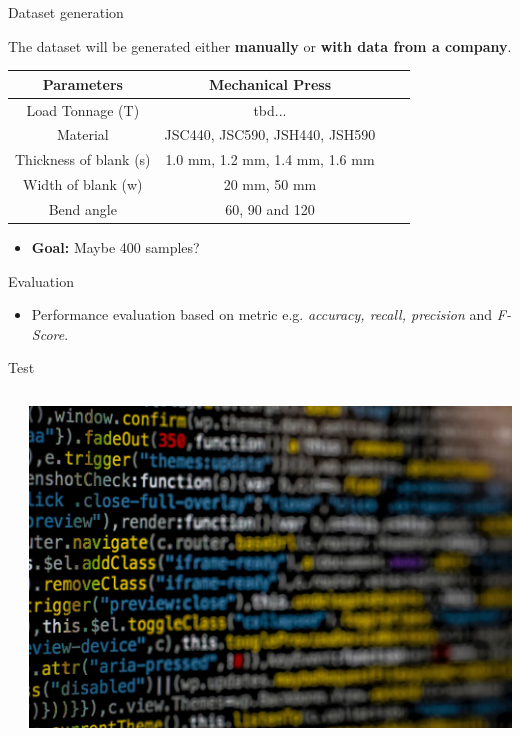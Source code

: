 \documentclass{beamer}
\begin{document}
\begin{frame}{Dataset generation}

The dataset will be generated either \textbf{manually} or \textbf{with data from a company}. 

\begin{center}
    \begin{tabular}{ |c|c|c|c| } 
        \hline
        Parameters & Mechanical Press \\
        \hline
        Load Tonnage (T) & tbd... \\
        Material & JSC440, JSC590, JSH440, JSH590 \\
        Thickness of blank (s) & 1.0 mm, 1.2 mm, 1.4 mm, 1.6 mm \\ 
        Width of blank (w) & 20 mm, 50 mm \\ 
        Bend angle & 60, 90 and 120 \\
        \hline
    \end{tabular}
\end{center}
\begin{itemize}
    \item \textbf{Goal:} Maybe 400 samples?
\end{itemize}
    
\end{frame}

\begin{frame}{Evaluation}
\begin{itemize}
    \item Performance evaluation based on metric e.g. \emph{accuracy, recall, precision} and \emph{F-Score}.
\end{itemize}
\end{frame}

\begin{frame}[t]{Test}\vspace{-0.1cm}
\begin{columns}
\begin{column}{0.6\textwidth}
\end{column}
\begin{column}{0.4\textwidth}
    \includegraphics[scale=0.4]{fig/code.jpg}
\end{column}
\end{columns} 

\end{frame}
\end{document}
